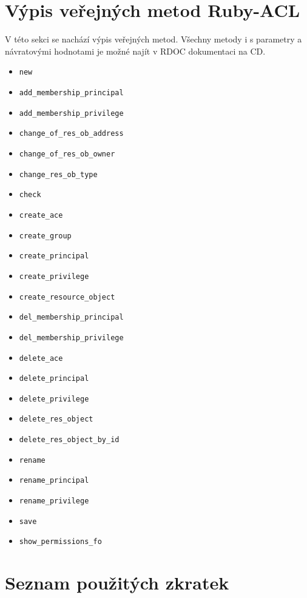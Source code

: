 \documentclass[11pt,twoside,a4paper]{book}
\begin{document}
\chapter{Výpis veřejných metod Ruby-ACL}
\label{sec:veřejné metody}
V této sekci se nachází výpis veřejných metod. Všechny metody i s parametry a návratovými hodnotami je možné najít v RDOC dokumentaci na CD.
\begin{itemize}
\item \verb|new|
\item \verb|add_membership_principal|
\item \verb|add_membership_privilege|
\item \verb|change_of_res_ob_address|
\item \verb|change_of_res_ob_owner|
\item \verb|change_res_ob_type|
\item \verb|check|
\item \verb|create_ace|
\item \verb|create_group|
\item \verb|create_principal|
\item \verb|create_privilege|
\item \verb|create_resource_object|
\item \verb|del_membership_principal|
\item \verb|del_membership_privilege|
\item \verb|delete_ace|
\item \verb|delete_principal|
\item \verb|delete_privilege|
\item \verb|delete_res_object|
\item \verb|delete_res_object_by_id|
\item \verb|rename|
\item \verb|rename_principal|
\item \verb|rename_privilege|
\item \verb|save|
\item \verb|show_permissions_fo|
\end{itemize}

\chapter{Seznam použitých zkratek}
\end{document}
